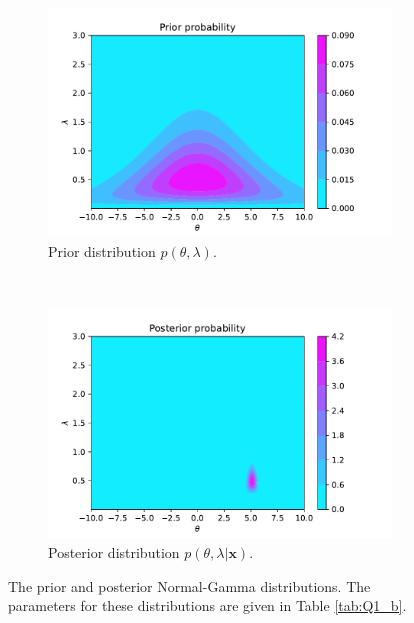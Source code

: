 \documentclass{article}
\begin{document}
\begin{figure}[htb!]
     \centering
     \begin{subfigure}[b]{0.45\textwidth}
         \centering
         \includegraphics[width=\textwidth]{Q1b_9.pdf}
         \caption{Prior distribution $p(\theta, \lambda)$.}
     \end{subfigure}
     ~
     \begin{subfigure}[b]{0.45\textwidth}
         \centering
         \includegraphics[width=\textwidth]{Q1b_11.pdf}
         \caption{Posterior distribution $p(\theta, \lambda \vert \mathbf{x})$.}
     \end{subfigure}
     
     \caption{The prior and posterior Normal-Gamma distributions. The parameters for these distributions are given in Table \ref{tab:Q1_b}.}
     \label{fig:Q1b_prior_posterior}
\end{figure}
\end{document}
